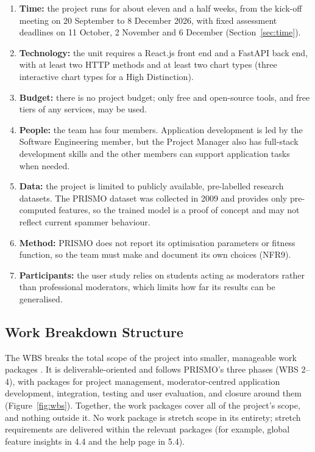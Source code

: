 \begin{enumerate}[label=\textbf{C\arabic*}, leftmargin=2.5em, nosep]
  \item \textbf{Time:} the project runs for about eleven and a half weeks, from the kick-off meeting on 20 September to 8 December 2026, with fixed assessment deadlines on 11 October, 2 November and 6 December (Section~\ref{sec:time}).
  \item \textbf{Technology:} the unit requires a React.js front end and a FastAPI back end, with at least two HTTP methods and at least two chart types (three interactive chart types for a High Distinction).
  \item \textbf{Budget:} there is no project budget; only free and open-source tools, and free tiers of any services, may be used.
  \item \textbf{People:} the team has four members. Application development is led by the Software Engineering member, but the Project Manager also has full-stack development skills and the other members can support application tasks when needed.
  \item \textbf{Data:} the project is limited to publicly available, pre-labelled research datasets. The PRISMO dataset was collected in 2009 and provides only pre-computed features, so the trained model is a proof of concept and may not reflect current spammer behaviour.
  \item \textbf{Method:} PRISMO does not report its optimisation parameters or fitness function, so the team must make and document its own choices (NFR9).
  \item \textbf{Participants:} the user study relies on students acting as moderators rather than professional moderators, which limits how far its results can be generalised.
\end{enumerate}

\subsection{Work Breakdown Structure}\label{sec:wbs}

The WBS breaks the total scope of the project into smaller, manageable work packages \parencite{pmi2021pmbok}. It is deliverable-oriented and follows PRISMO's three phases (WBS 2--4), with packages for project management, moderator-centred application development, integration, testing and user evaluation, and closure around them (Figure~\ref{fig:wbs}). Together, the work packages cover all of the project's scope, and nothing outside it. No work package is stretch scope in its entirety; stretch requirements are delivered within the relevant packages (for example, global feature insights in 4.4 and the help page in 5.4).

